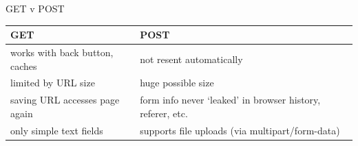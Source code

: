 \begin{frame}{GET v POST}
\begin{tabular}{p{7cm}|p{7cm}}
GET & POST \\ \hline
works with back button, caches & not resent automatically \\
limited by URL size & huge possible size \\
saving URL accesses page again & form info never `leaked' in browser history, referer, etc.\\
only simple text fields & supports file uploads (via multipart/form-data) \\
\end{tabular}
\end{frame}

